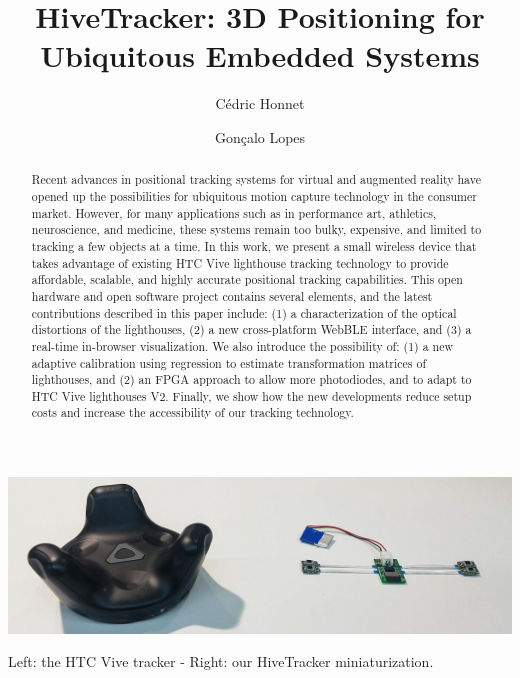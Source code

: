 \documentclass[sigchi]{acmart}
\begin{document}
\title{HiveTracker: 3D Positioning for Ubiquitous Embedded Systems}

\author{C\'edric Honnet}

\author{Gon\c{c}alo Lopes}

\begin{teaserfigure}
\centering
\includegraphics[width=1.0\columnwidth]{Figures/banner.jpg}
\caption{Left: the HTC Vive tracker - Right: our HiveTracker miniaturization.}
\label{Fig:Banner}
\end{teaserfigure}

\begin{abstract}
Recent advances in positional tracking systems for virtual and augmented reality have opened up the possibilities for ubiquitous motion capture technology in the consumer market. However, for many applications such as in performance art, athletics, neuroscience, and medicine, these systems remain too bulky, expensive, and limited to tracking a few objects at a time. In this work, we present a small wireless device that takes advantage of existing HTC Vive lighthouse tracking technology to provide affordable, scalable, and highly accurate positional tracking capabilities. This open hardware and open software project contains several elements, and the latest contributions described in this paper include: (1) a characterization of the optical distortions of the lighthouses, (2) a new cross-platform WebBLE interface, and (3) a real-time in-browser visualization. We also introduce the possibility of: (1) a new adaptive calibration using regression to estimate transformation matrices of lighthouses, and (2) an FPGA approach to allow more photodiodes, and to adapt to HTC Vive lighthouses V2. Finally, we show how the new developments reduce setup costs and increase the accessibility of our tracking technology.
\end{abstract}
\end{document}
